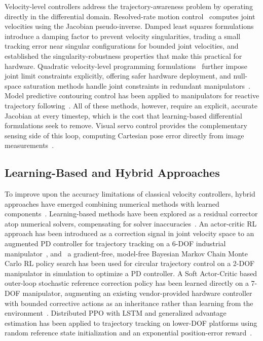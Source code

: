 Velocity-level controllers address the trajectory-awareness problem by operating directly in the
differential domain. Resolved-rate motion control~\citep{whitney1969resolved} computes joint
velocities using the Jacobian pseudo-inverse. Damped least squares
formulations~\citep{wampler1986manipulator,chiaverini1994review} introduce a damping factor to
prevent velocity singularities, trading a small tracking error near singular configurations for
bounded joint velocities, and \citet{nakamura1986inverse} established the singularity-robustness
properties that make this practical for hardware. Quadratic velocity-level programming
formulations~\citep{zhang2013variable} further impose joint limit constraints explicitly, offering
safer hardware deployment, and null-space saturation methods handle joint constraints in redundant
manipulators~\citep{flacco2012motion}. Model predictive contouring control has been applied to
manipulators for reactive trajectory following~\citep{yoon2025reactive}. All of these methods,
however, require an explicit, accurate Jacobian at every timestep, which is the cost that
learning-based differential formulations seek to remove. Visual servo
control provides the complementary sensing side of this loop, computing Cartesian pose error
directly from image measurements~\citep{hutchinson1996tutorial}.

\subsection{Learning-Based and Hybrid Approaches}\label{subsec:lit_learned_ik}

To improve upon the accuracy limitations of classical velocity controllers, hybrid approaches have
emerged combining numerical methods with learned components~\citep{wang2023two}. Learning-based methods have been explored as a residual corrector atop numerical solvers, compensating for solver inaccuracies~\citep{jia2019finite, chen2019neural}. An actor-critic RL approach has been introduced as a correction signal in joint velocity space to an augmented PD controller for trajectory tracking on a 6-DOF industrial manipulator~\citep{pane2016actor}, and~\citet{aghaei2022real} a
gradient-free, model-free Bayesian Markov Chain Monte Carlo RL policy search has been used for
circular trajectory control on a 2-DOF manipulator in simulation to optimize a PD controller. A Soft
Actor-Critic based outer-loop stochastic reference correction policy has been learned directly on a
7-DOF manipulator, augmenting an existing vendor-provided hardware controller with bounded
corrective actions as an inheritance rather than learning from the environment~\citep{pavlichenko2022real}. Distributed PPO with
LSTM and generalized advantage estimation has been applied to trajectory tracking on lower-DOF
platforms using random reference state initialization and an exponential position-error
reward~\citep{zhang2019trajectory}.


